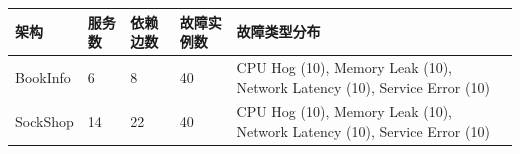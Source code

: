 \begin{longtable}[]{@{}lllll@{}}
\toprule
\begin{minipage}[b]{0.10\columnwidth}\raggedright
架构\strut
\end{minipage} & \begin{minipage}[b]{0.14\columnwidth}\raggedright
服务数\strut
\end{minipage} & \begin{minipage}[b]{0.17\columnwidth}\raggedright
依赖边数\strut
\end{minipage} & \begin{minipage}[b]{0.21\columnwidth}\raggedright
故障实例数\strut
\end{minipage} & \begin{minipage}[b]{0.24\columnwidth}\raggedright
故障类型分布\strut
\end{minipage}\tabularnewline
\midrule
\endhead
\begin{minipage}[t]{0.10\columnwidth}\raggedright
BookInfo\strut
\end{minipage} & \begin{minipage}[t]{0.14\columnwidth}\raggedright
6\strut
\end{minipage} & \begin{minipage}[t]{0.17\columnwidth}\raggedright
8\strut
\end{minipage} & \begin{minipage}[t]{0.21\columnwidth}\raggedright
40\strut
\end{minipage} & \begin{minipage}[t]{0.24\columnwidth}\raggedright
CPU Hog (10), Memory Leak (10), Network Latency (10), Service Error
(10)\strut
\end{minipage}\tabularnewline
\begin{minipage}[t]{0.10\columnwidth}\raggedright
SockShop\strut
\end{minipage} & \begin{minipage}[t]{0.14\columnwidth}\raggedright
14\strut
\end{minipage} & \begin{minipage}[t]{0.17\columnwidth}\raggedright
22\strut
\end{minipage} & \begin{minipage}[t]{0.21\columnwidth}\raggedright
40\strut
\end{minipage} & \begin{minipage}[t]{0.24\columnwidth}\raggedright
CPU Hog (10), Memory Leak (10), Network Latency (10), Service Error
(10)\strut
\end{minipage}\tabularnewline

\end{longtable}
